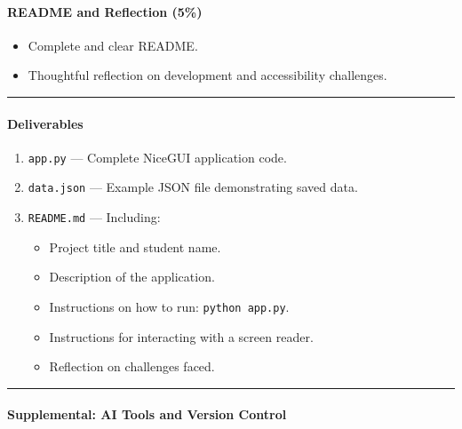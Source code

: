 \documentclass[
  justified,
  openright,
]{tufte-book}
\let\subsection\paragraph
\let\paragraph\paragraph
\let\subsection\paragraph
\let\paragraph\paragraph
\providecommand{\tightlist}{%
  \setlength{\itemsep}{0pt}\setlength{\parskip}{0pt}}
\begin{document}
\subsection{README and Reflection
(5\%)}\label{readme-and-reflection-5}

\begin{itemize}
\tightlist
\item[$\square$]
  Complete and clear README.
\item[$\square$]
  Thoughtful reflection on development and accessibility challenges.
\end{itemize}

\begin{center}\rule{0.5\linewidth}{0.5pt}\end{center}

\subsection{Deliverables}\label{deliverables}

\begin{enumerate}
\def\labelenumi{\arabic{enumi}.}
\tightlist
\item
  \texttt{app.py} --- Complete NiceGUI application code.
\item
  \texttt{data.json} --- Example JSON file demonstrating saved data.
\item
  \texttt{README.md} --- Including:

  \begin{itemize}
  \tightlist
  \item
    Project title and student name.
  \item
    Description of the application.
  \item
    Instructions on how to run: \texttt{python\ app.py}.
  \item
    Instructions for interacting with a screen reader.
  \item
    Reflection on challenges faced.
  \end{itemize}
\end{enumerate}

\begin{center}\rule{0.5\linewidth}{0.5pt}\end{center}

\subsection{Supplemental: AI Tools and Version
Control}\label{supplemental-ai-tools-and-version-control}
\end{document}
